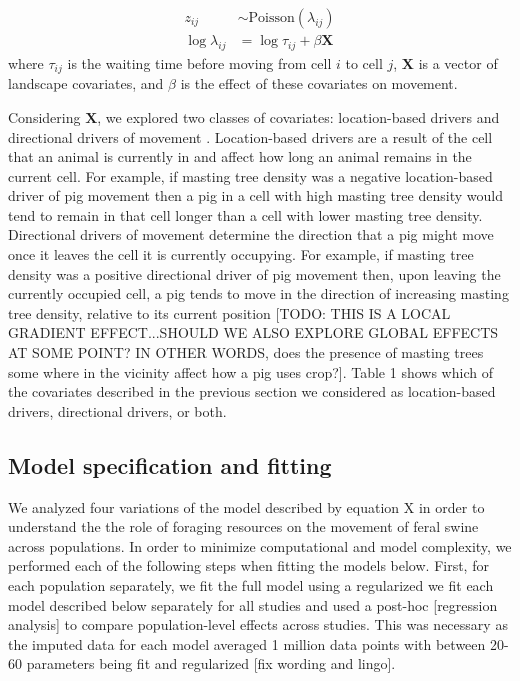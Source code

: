 \documentclass[a4paper]{article}
\begin{document}
\begin{align}
  z_{ij} &\sim \text{Poisson}(\lambda_{ij}) \\
  \log \lambda_{ij} &= \log{\tau_{ij}} + \beta \mathbf{X}
\end{align}
where $\tau_{ij}$ is the waiting time before moving from cell $i$ to cell $j$, $\mathbf{X}$ is a vector of landscape covariates, and $\beta$ is the effect of these covariates on movement.  

Considering $\mathbf{X}$, we explored two classes of covariates: location-based drivers and directional drivers of movement \citep{Hanks2015}.  Location-based drivers are a result of the cell that an animal is currently in and affect how long an animal remains in the current cell.  For example, if masting tree density was a negative location-based driver of pig movement then a pig in a cell with high masting tree density would tend to remain in that cell longer than a cell with lower masting tree density. Directional drivers of movement determine the direction that a pig might move once it leaves the cell it is currently occupying.  For example, if masting tree density was a positive directional driver of pig movement then, upon leaving the currently occupied cell, a pig tends to move in the direction of increasing masting tree density, relative to its current position [TODO: THIS IS A LOCAL GRADIENT EFFECT...SHOULD WE ALSO EXPLORE GLOBAL EFFECTS AT SOME POINT? IN OTHER WORDS, does the presence of masting trees some where in the vicinity affect how a pig uses crop?]. Table 1 shows which of the covariates described in the previous section we considered as location-based drivers, directional drivers, or both.  

\subsection*{Model specification and fitting}

We analyzed four variations of the model described by equation X in order to understand the the role of foraging resources on the movement of feral swine across populations.  In order to minimize computational and model complexity, we performed each of the following steps when fitting the models below.  First, for each population separately, we fit the full model using a regularized  we fit each model described below separately for all studies and used a post-hoc [regression analysis] to compare population-level effects across studies.  This was necessary as the imputed data for each model averaged 1 million data points with between 20-60 parameters being fit and regularized [fix wording and lingo].
\end{document}
